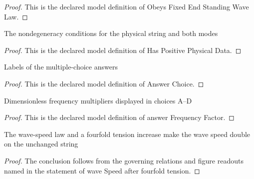 \begin{proof}
  This is the declared model definition of Obeys Fixed End Standing Wave Law.
\end{proof}
\begin{definition}
  \label{def:physics:phyx-mini-0178:phyxminiproblems-problemphyxmini0178-haspositivephysicaldata}
  The nondegeneracy conditions for the physical string and both modes
\end{definition}
\begin{proof}
  This is the declared model definition of Has Positive Physical Data.
\end{proof}
\begin{definition}
  \label{def:physics:phyx-mini-0178:phyxminiproblems-problemphyxmini0178-answerchoice}
  Labels of the multiple-choice answers
\end{definition}
\begin{proof}
  This is the declared model definition of Answer Choice.
\end{proof}
\begin{definition}
  \label{def:physics:phyx-mini-0178:phyxminiproblems-problemphyxmini0178-answerfrequencyfactor}
  Dimensionless frequency multipliers displayed in choices A--D
\end{definition}
\begin{proof}
  This is the declared model definition of answer Frequency Factor.
\end{proof}
\begin{theorem}
  \label{thm:physics:phyx-mini-0178:phyxminiproblems-problemphyxmini0178-wavespeed-after-fourfold-tension}
  The wave-speed law and a fourfold tension increase make the wave speed double on the unchanged string
\end{theorem}
\begin{proof}
  The conclusion follows from the governing relations and figure readouts named in the statement of wave Speed after fourfold tension.
\end{proof}
